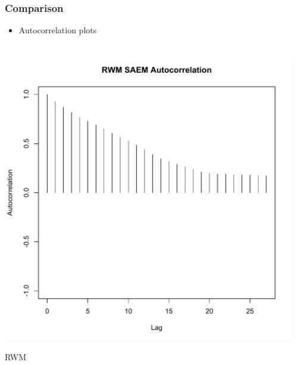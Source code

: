 \documentclass[xcolor={dvipsnames}]{beamer}
\begin{document}
\begin{frame}
\frametitle{Comparison}

\begin{itemize}
  \item Autocorrelation plots
\end{itemize}

  \begin{columns}
    \begin{column}{.30\textwidth} %
      
      \includegraphics[scale=0.2]{rwm_autocorr.pdf}
      \begin{center}
      \caption{RWM}
      \end{center}
    \end{column}%
    \hfill%
    \begin{column}{.30 \textwidth} %
      

\end{column}
\end{columns}
\end{frame}
\end{document}
